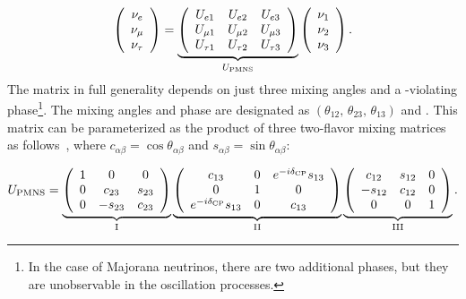 \begin{equation}
\left(\begin{array}{ccc} \nu_e \\ \nu_\mu \\ \nu_\tau \end{array} \right)= 
\underbrace{
  \left(\begin{array}{ccc}
      U_{e 1} &  U_{e 2} & U_{e 3} \\ 
      U_{\mu1} &  U_{\mu2} & U_{\mu 3} \\ 
      U_{\tau 1} &  U_{\tau 2} & U_{\tau 3} 
    \end{array} \right)
}_{U_{\rm PMNS}} \left(\begin{array}{ccc} \nu_1 \\ \nu_2 \\ \nu_3 \end{array} \right).
\label{eqn:pmns0}
\end{equation}
The  matrix in full generality depends on just three mixing angles
and a -violating phase\footnote{In the case of Majorana neutrinos, there are two additional  phases, but they are unobservable in the oscillation processes.}.  The mixing angles and phase are designated
as $(\theta_{12},\, \theta_{23},\, \theta_{13})$ and
\deltacp.
This matrix can be parameterized as the product of three
two-flavor mixing matrices as follows~\cite{Schechter:1980gr}, where $c_{\alpha \beta}=\cos \theta_{\alpha \beta}$ and $s_{\alpha
 \beta}=\sin \theta_{\alpha \beta}$:

\begin{equation}
U_{\rm PMNS} = 
  \underbrace{
    \left( \begin{array}{ccc}
        1 & 0 & 0 \\ 
        0 & c_{23} & s_{23} \\ 
        0 & -s_{23} & c_{23}
    \end{array} \right)
  }_{\rm I}
\underbrace{
  \left( \begin{array}{ccc}
        c_{13} & 0  & e^{-i\delta_{\rm CP}} s_{13} \\ 
         0 & 1 & 0 \\ 
        e^{-i\delta_{\rm CP}} s_{13} & 0 & c_{13}
  \end{array} \right)   
  }_{\rm II}
\underbrace{
 \left( \begin{array}{ccc}
      c_{12} & s_{12} & 0 \\ 
      -s_{12} & c_{12} & 0 \\ 
      0 & 0 & 1
  \end{array} \right)
}_{\rm III}.
\label{eqn:pmns}
\end{equation}


